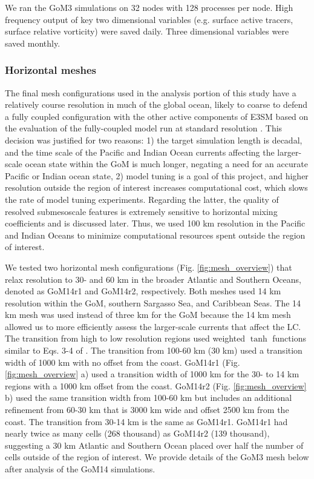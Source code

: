 We ran the GoM3 simulations on 32 nodes with 128 processes per node. High frequency output of key two dimensional variables (e.g. surface active tracers, surface relative vorticity) were saved daily. Three dimensional variables were saved monthly.  

\subsubsection{Horizontal meshes}
The final mesh configurations used in the analysis portion of this study have a relatively course resolution in much of the global ocean, likely to coarse to defend a fully coupled configuration with the other active components of E3SM based on the evaluation of the fully-coupled model run at standard resolution \citep{golaz2019doe}. This decision was justified for two reasons: 1) the target simulation length is decadal, and the time scale of the Pacific and Indian Ocean currents affecting the larger-scale ocean state within the GoM is much longer, negating a need for an accurate Pacific or Indian ocean state, 2) model tuning is a goal of this project, and higher resolution outside the region of interest increases computational cost, which slows the rate of model tuning experiments. Regarding the latter, the quality of resolved submesoscale features is extremely sensitive to horizontal mixing coefficients and is discussed later. Thus, we used 100 km resolution in the Pacific and Indian Oceans to minimize computational resources spent outside the region of interest. 

We tested two horizontal mesh configurations (Fig. \ref{fig:mesh_overview}) that relax resolution to 30- and 60 km in the broader Atlantic and Southern Oceans, denoted as GoM14r1 and GoM14r2, respectively. Both meshes used 14 km resolution within the GoM, southern Sargasso Sea, and Caribbean Seas. The 14 km mesh was used instead of three km for the GoM because the 14 km mesh allowed us to more efficiently assess the larger-scale currents that affect the LC. The transition from high to low resolution regions used weighted $\tanh$ functions similar to Eqs. 3-4 of \cite{hoch2020mpas}. The transition from 100-60 km (30 km) used a transition width of 1000 km with no offset from the coast. GoM14r1 (Fig. \ref{fig:mesh_overview} a) used a transition width of 1000 km for the 30- to 14 km regions with a 1000 km offset from the coast. GoM14r2 (Fig. \ref{fig:mesh_overview} b) used the same transition width from 100-60 km but includes an additional refinement from 60-30 km that is 3000 km wide and offset 2500 km from the coast. The transition from 30-14 km is the same as GoM14r1. GoM14r1 had nearly twice as many cells (268 thousand) as GoM14r2 (139 thousand), suggesting a 30 km Atlantic and Southern Ocean placed over half the number of cells outside of the region of interest. We provide details of the GoM3 mesh below after analysis of the GoM14 simulations. 

